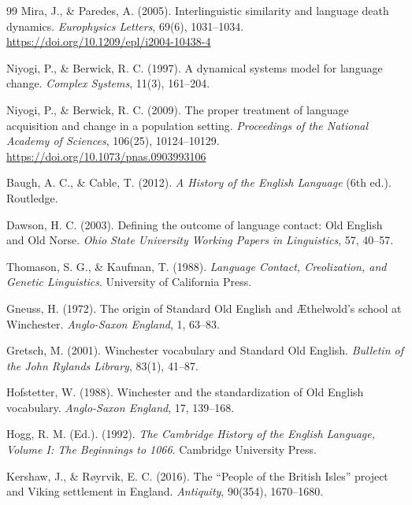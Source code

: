 \documentclass[11pt]{article}
\begin{document}
\begin{thebibliography}{99}
Mira, J., \& Paredes, A. (2005). Interlinguistic similarity and language death dynamics. \textit{Europhysics Letters}, 69(6), 1031--1034. \url{https://doi.org/10.1209/epl/i2004-10438-4}

Niyogi, P., \& Berwick, R. C. (1997). A dynamical systems model for language change. \textit{Complex Systems}, 11(3), 161--204.

Niyogi, P., \& Berwick, R. C. (2009). The proper treatment of language acquisition and change in a population setting. \textit{Proceedings of the National Academy of Sciences}, 106(25), 10124--10129. \url{https://doi.org/10.1073/pnas.0903993106}

Baugh, A. C., \& Cable, T. (2012). \textit{A History of the English Language} (6th ed.). Routledge.

Dawson, H. C. (2003). Defining the outcome of language contact: Old English and Old Norse. \textit{Ohio State University Working Papers in Linguistics}, 57, 40--57.

Thomason, S. G., \& Kaufman, T. (1988). \textit{Language Contact, Creolization, and Genetic Linguistics}. University of California Press.

Gneuss, H. (1972). The origin of Standard Old English and \AE thelwold's school at Winchester. \textit{Anglo-Saxon England}, 1, 63--83.

Gretsch, M. (2001). Winchester vocabulary and Standard Old English. \textit{Bulletin of the John Rylands Library}, 83(1), 41--87.

Hofstetter, W. (1988). Winchester and the standardization of Old English vocabulary. \textit{Anglo-Saxon England}, 17, 139--168.

Hogg, R. M. (Ed.). (1992). \textit{The Cambridge History of the English Language, Volume I: The Beginnings to 1066}. Cambridge University Press.

Kershaw, J., \& R{\o}yrvik, E. C. (2016). The ``People of the British Isles'' project and Viking settlement in England. \textit{Antiquity}, 90(354), 1670--1680.


\end{thebibliography}
\end{document}
